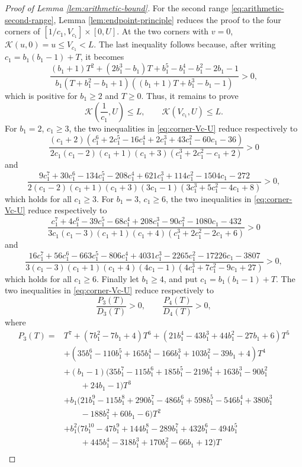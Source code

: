 \documentclass[11pt]{amsart}
\newcommand{\Kfun}{\mathcal K}
\begin{document}
\begin{proof}[Proof of Lemma \ref{lem:arithmetic-bound}]
For the second range \eqref{eq:arithmetic-second-range}, Lemma \ref{lem:endpoint-principle} reduces the proof
to the four corners of $[1/c_1,V_{c_1}]\times[0,U]$.  At the two corners with
$v=0$, $\Kfun(u,0)=u\le V_{c_1}<L$.  The last inequality follows because, after writing $c_1=b_1(b_1-1)+T$, it becomes
$$
        \frac{(b_1+1)T^2+(2b_1^3-b_1)T+b_1^5-b_1^4-b_1^2-2b_1-1}{b_1(T+b_1^2-b_1+1)((b_1+1)T+b_1^3-b_1-1)}>0,
$$
which is positive for $b_1\ge2$ and $T\ge0$.
Thus, it remains to prove
\begin{equation}\label{eq:corner-Vc-U}
        \Kfun\left(\frac{1}{c_1},U\right)\le L,
        \qquad
        \Kfun(V_{c_1},U)\le L.
\end{equation}
For $b_1=2$, $c_1\geq3$, the two inequalities in \eqref{eq:corner-Vc-U} reduce respectively to
$$
        \frac{(c_1+2)(c_1^6+2c_1^5-16c_1^4+2c_1^3+43c_1^2-60c_1-36)}{2c_1(c_1-2)(c_1+1)(c_1+3)(c_1^3+2c_1^2-c_1+2)}>0
$$
and
$$
        \frac{9c_1^7+30c_1^6-134c_1^5-208c_1^4+621c_1^3+114c_1^2-1504c_1-272}{2(c_1-2)(c_1+1)(c_1+3)(3c_1-1)(3c_1^3+5c_1^2-4c_1+8)}>0,
$$
which holds for all $c_1\ge3$.
For $b_1=3$, $c_1\geq6$, the two inequalities in \eqref{eq:corner-Vc-U} reduce respectively to
$$
        \frac{c_1^7+4c_1^6-39c_1^5-68c_1^4+208c_1^3-90c_1^2-1080c_1-432}{3c_1(c_1-3)(c_1+1)(c_1+4)(c_1^3+2c_1^2-2c_1+6)}>0
$$
and
$$
        \frac{16c_1^7+56c_1^6-663c_1^5-806c_1^4+4031c_1^3-2265c_1^2-17226c_1-3807}{3(c_1-3)(c_1+1)(c_1+4)(4c_1-1)(4c_1^3+7c_1^2-9c_1+27)}>0,
$$
which holds for all $c_1\ge6$.
Finally let $b_1\ge4$, and put $c_1=b_1(b_1-1)+T$.  The two inequalities in \eqref{eq:corner-Vc-U} reduce respectively to
$$
        \frac{P_3(T)}{D_3(T)}>0,
        \qquad
        \frac{P_4(T)}{D_4(T)}>0,
$$
where
\begin{align*}
P_3(T)={}&T^7+(7b_1^2-7b_1+4)T^6+(21b_1^4-43b_1^3+44b_1^2-27b_1+6)T^5\\
        &+(35b_1^6-110b_1^5+165b_1^4-166b_1^3+103b_1^2-39b_1+4)T^4\\
        &+(b_1-1)(35b_1^7-115b_1^6+185b_1^5-219b_1^4+163b_1^3-90b_1^2\\
        &\qquad +24b_1-1)T^3\\
        &+b_1(21b_1^9-115b_1^8+290b_1^7-486b_1^6+598b_1^5-546b_1^4+380b_1^3\\
        &\qquad -188b_1^2+60b_1-6)T^2\\
        &+b_1^2(7b_1^{10}-47b_1^9+144b_1^8-289b_1^7+432b_1^6-494b_1^5\\
        &\qquad +445b_1^4-318b_1^3+170b_1^2-66b_1+12)T\\

\end{align*}
\end{proof}
\end{document}
